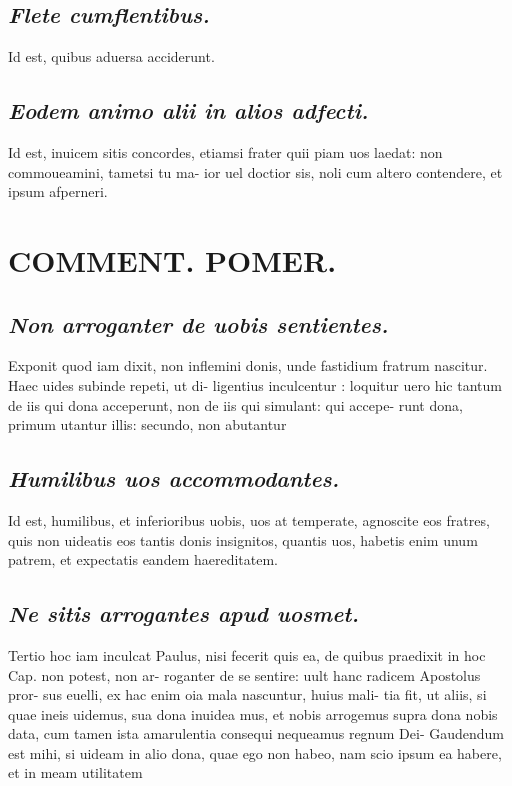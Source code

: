 \documentclass{article}
\begin{document}
\begin{pages}
\subsection*{\textit{Flete cumflentibus. }}\pstart Id est, quibus aduersa acciderunt.   \pend
{}
{}
\subsection*{\textit{Eodem animo alii in alios adfecti. }}\pstart Id est, inuicem sitis concordes, etiamsi frater quii piam uos laedat: non commoueamini, tametsi tu ma- ior uel doctior sis, noli cum altero contendere, et ipsum afperneri.   \pend
\section*{COMMENT. POMER.  }
{}
\subsection*{\textit{Non arroganter de uobis sentientes. }}\pstart Exponit quod iam dixit, non inflemini donis, unde fastidium fratrum nascitur. Haec uides subinde repeti, ut di- ligentius inculcentur : loquitur uero hic tantum de iis qui dona acceperunt, non de iis qui simulant: qui accepe- runt dona, primum utantur illis: secundo, non abutantur  \pend
{}
{}
\subsection*{\textit{Humilibus uos accommodantes. }}\pstart Id est, humilibus, et inferioribus uobis, uos at temperate, agnoscite eos fratres, quis non uideatis eos tantis donis insignitos, quantis uos, habetis enim unum patrem, et expectatis eandem haereditatem.   \pend
{}
{}
\subsection*{\textit{Ne sitis arrogantes apud uosmet. }}\pstart Tertio hoc iam inculcat Paulus, nisi fecerit quis ea, de quibus praedixit in hoc Cap. non potest, non ar- roganter de se sentire: uult hanc radicem Apostolus pror- sus euelli, ex hac enim oia mala nascuntur, huius mali- tia fit, ut aliis, si quae ineis uidemus, sua dona inuidea mus, et nobis arrogemus supra dona nobis data, cum tamen ista amarulentia consequi nequeamus regnum Dei- Gaudendum est mihi, si uideam in alio dona, quae ego non habeo, nam scio ipsum ea habere, et in meam utilitatem  \pend
{}
{}

\end{pages}
\end{document}

